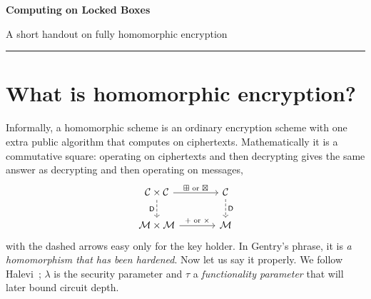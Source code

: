 \documentclass[11pt,a4paper]{article}
\newcommand{\Dec}{\mathsf{D}}
\newcommand{\Msg}{\mathcal{M}}
\newcommand{\Ctx}{\mathcal{C}}
\newcommand{\hadd}{\boxplus}
\newcommand{\hmul}{\boxtimes}
\begin{document}
\begin{center}
  {\sffamily\bfseries\color{fheblue}\LARGE Computing on Locked Boxes\par}
  \vspace{2pt}
  {\sffamily\large\color{fhegray} A short handout on fully homomorphic encryption\par}
  \vspace{4pt}
  {\color{fheblue}\rule{0.5\textwidth}{0.8pt}}
\end{center}


\section{What is homomorphic encryption?}

Informally, a homomorphic scheme is an ordinary encryption scheme with one
extra public algorithm that computes on ciphertexts. Mathematically it is a
commutative square: operating on ciphertexts and then decrypting gives the
same answer as decrypting and then operating on messages,
\[
\begin{tikzcd}[column sep=large,row sep=normal]
\Ctx\times\Ctx \arrow[r,"\hadd\text{ or }\hmul"] \arrow[d,dashed,"\Dec"'] & \Ctx \arrow[d,dashed,"\Dec"]\\
\Msg\times\Msg \arrow[r,"+\text{ or }\times"] & \Msg
\end{tikzcd}
\]
with the dashed arrows easy only for the key holder. In Gentry's phrase, it is
\emph{a homomorphism that has been hardened}. Now let us say it properly. We
follow Halevi~\cite[\S2.1]{halevi}; $\lambda$ is the security parameter and
$\tau$ a \emph{functionality parameter} that will later bound circuit depth.
\end{document}
